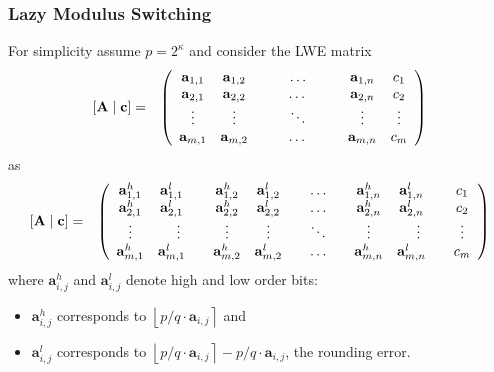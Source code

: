 \documentclass[10pt]{beamer}
\renewcommand{\vec}[1]{\mathbf{#1}\xspace}
\newcommand{\round}[1]{\ensuremath{\left\lfloor{#1}\right\rceil}\xspace}
\begin{document}
\begin{frame}[allowframebreaks]
\frametitle{Lazy Modulus Switching} 
For simplicity assume $p = 2^\kappa$ and consider the LWE matrix
\begin{eqnarray*}
\footnotesize
[\vec{A} \mid \vec{c}] &=& \left(\begin{array}{ccccc}
       \vec{a}_{1,1} & \vec{a}_{1,2} & \hspace{2em} \dots \hspace{2em} & \vec{a}_{1,n} & c_1\\
       \vec{a}_{2,1} & \vec{a}_{2,2} & \dots & \vec{a}_{2,n} & c_2\\
        \vdots & \vdots & \ddots & \vdots & \vdots\\
       \vec{a}_{m,1} & \vec{a}_{m,2} & \dots & \vec{a}_{m,n} & c_{m}\\
      \end{array}\right)\\
\end{eqnarray*}
as
\begin{eqnarray*}
\footnotesize
[\vec{A} \mid \vec{c}] & = & \left(\begin{array}{cccccccc}
       \vec{a}_{1,1}^h & \vec{a}_{1,1}^{l} \hspace{1em} & \vec{a}_{1,2}^h & \vec{a}_{1,2}^{l} & \hspace{1em} \dots \hspace{1em} & \vec{a}_{1,n}^h & \vec{a}_{1,n}^{l}  \hspace{1em} & c_1\\
       \vec{a}_{2,1}^h & \vec{a}_{2,1}^{l} \hspace{1em} & \vec{a}_{2,2}^h & \vec{a}_{2,2}^{l} & \hspace{1em} \dots \hspace{1em} & \vec{a}_{2,n}^h & \vec{a}_{2,n}^{l}  \hspace{1em} & c_2\\
        \vdots & \vdots & \vdots & \vdots & \ddots & \vdots & \vdots & \vdots\\
       \vec{a}_{m,1}^h & \vec{a}_{m,1}^{l} \hspace{1em} & \vec{a}_{m,2}^h & \vec{a}_{m,2}^{l} & \hspace{1em} \dots \hspace{1em} & \vec{a}_{m,n}^h & \vec{a}_{m,n}^{l}  \hspace{1em} & c_{m}\\
      \end{array}\right)\\
\end{eqnarray*}
where $\vec{a}_{i,j}^h$ and $\vec{a}_{i,j}^{l}$ denote high and low order bits:
\begin{itemize}
 \item $\vec{a}_{i,j}^h$ corresponds to $\round{p/q \cdot \vec{a}_{i,j}}$ and 
 \item $\vec{a}_{i,j}^l$ corresponds to $\round{p/q \cdot \vec{a}_{i,j}} - p/q \cdot \vec{a}_{i,j}$, the rounding error.
\end{itemize}


\end{frame}
\end{document}
